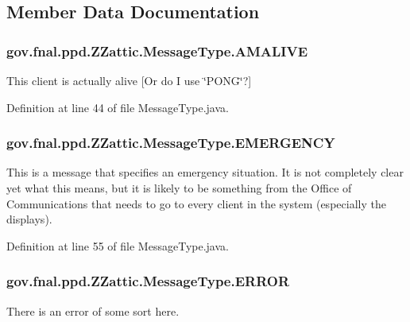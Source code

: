\subsection{Member Data Documentation}
\hypertarget{enumgov_1_1fnal_1_1ppd_1_1ZZattic_1_1MessageType_a420f0982959f71b7899e7edee8625e43}{
\subsubsection[{A\-M\-A\-L\-I\-V\-E}]{\setlength{\rightskip}{0pt plus 5cm}gov.\-fnal.\-ppd.\-Z\-Zattic.\-Message\-Type.\-A\-M\-A\-L\-I\-V\-E}}\label{enumgov_1_1fnal_1_1ppd_1_1ZZattic_1_1MessageType_a420f0982959f71b7899e7edee8625e43}
This client is actually alive \mbox{[}Or do I use \char`\"{}\-P\-O\-N\-G\char`\"{}?\mbox{]} 

Definition at line 44 of file Message\-Type.\-java.

\hypertarget{enumgov_1_1fnal_1_1ppd_1_1ZZattic_1_1MessageType_a8a6cc8f8eed3c874f5bdf50a2d257d99}{
\subsubsection[{E\-M\-E\-R\-G\-E\-N\-C\-Y}]{\setlength{\rightskip}{0pt plus 5cm}gov.\-fnal.\-ppd.\-Z\-Zattic.\-Message\-Type.\-E\-M\-E\-R\-G\-E\-N\-C\-Y}}\label{enumgov_1_1fnal_1_1ppd_1_1ZZattic_1_1MessageType_a8a6cc8f8eed3c874f5bdf50a2d257d99}
This is a message that specifies an emergency situation. It is not completely clear yet what this means, but it is likely to be something from the Office of Communications that needs to go to every client in the system (especially the displays). 

Definition at line 55 of file Message\-Type.\-java.

\hypertarget{enumgov_1_1fnal_1_1ppd_1_1ZZattic_1_1MessageType_a367c7f63789c3a45808b4ddbd7fa28c6}{
\subsubsection[{E\-R\-R\-O\-R}]{\setlength{\rightskip}{0pt plus 5cm}gov.\-fnal.\-ppd.\-Z\-Zattic.\-Message\-Type.\-E\-R\-R\-O\-R}}\label{enumgov_1_1fnal_1_1ppd_1_1ZZattic_1_1MessageType_a367c7f63789c3a45808b4ddbd7fa28c6}
There is an error of some sort here. 

